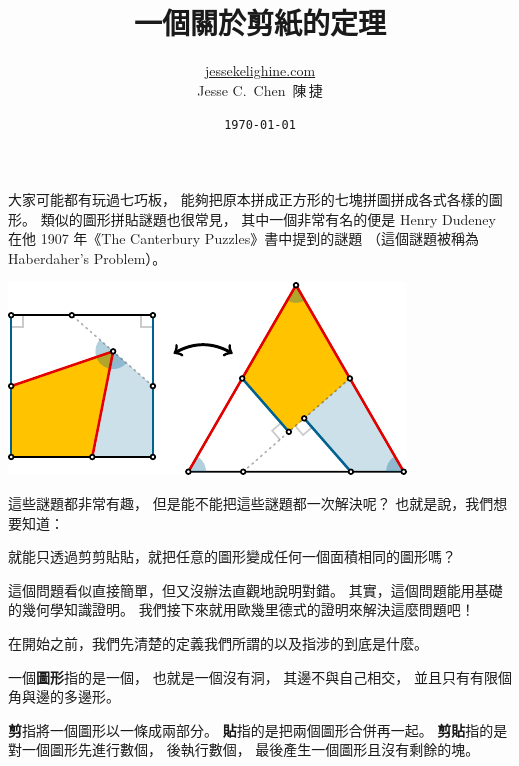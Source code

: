 \documentclass{article}
\title{一個關於剪紙的定理}
\author{\href{https://jessekelighine.com}{jessekelighine.com}\\Jesse C.\ Chen\ 陳\,捷}
\date{\texttt{\today}}
\begin{document}
\begin{multicols}{2}

\begin{spacing}{1}
	\maketitle\thispagestyle{fancy}
\end{spacing}

\noindent
大家可能都有玩過七巧板，
能夠把原本拼成正方形的七塊拼圖拼成各式各樣的圖形。
類似的圖形拼貼謎題也很常見，
其中一個非常有名的便是 Henry Dudeney 在他 1907 年《The Canterbury Puzzles》書中提到的謎題
（這個謎題被稱為 Haberdaher's Problem）。
\begin{center}
	\includegraphics[scale=1]{figures/figure-example.pdf}
\end{center}
這些謎題都非常有趣，
但是能不能把這些謎題都一次解決呢？
也就是說，我們想要知道：
\begin{question*}
	就能只透過剪剪貼貼，就把任意的圖形變成任何一個面積相同的圖形嗎？
\end{question*}
這個問題看似直接簡單，但又沒辦法直觀地說明對錯。
其實，這個問題能用基礎的幾何學知識證明。
我們接下來就用歐幾里德式的證明來解決這麼問題吧！

\dinkus

\noindent
在開始之前，我們先清楚的定義我們所謂的以及指涉的到底是什麼。

\begin{definition}[圖形]
	一個\textbf{圖形}指的是一個，
	也就是一個沒有洞，
	其邊不與自己相交，
	並且只有有限個角與邊的多邊形。
\end{definition}

\begin{definition}[剪貼]
	\textbf{剪}指將一個圖形以一條成兩部分。
	\textbf{貼}指的是把兩個圖形合併再一起。
	\textbf{剪貼}指的是對一個圖形先進行數個，
	後執行數個，
	最後產生一個圖形且沒有剩餘的塊。
\end{definition}


\end{multicols}
\end{document}
